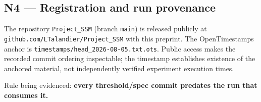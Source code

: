 \documentclass[
  10pt,
]{article}
\begin{document}
\subsection{N4 --- Registration and run
provenance}\label{n4-registration-and-run-provenance}

The repository \texttt{Project\_SSM} (branch \texttt{main}) is released
publicly at \texttt{github.com/LTalandier/Project\_SSM} with this
preprint. The OpenTimestamps anchor is
\texttt{timestamps/head\_2026-08-05.txt.ots}. Public access makes the
recorded commit ordering inspectable; the timestamp establishes
existence of the anchored material, not independently verified
experiment execution times.

Rule being evidenced: \textbf{every threshold/spec commit predates the
run that consumes it.}
\end{document}
